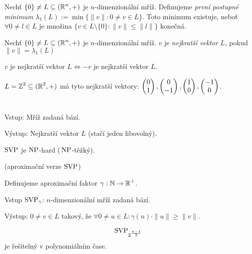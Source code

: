 \begin{definition}
Nechť $\{0\}\neq L\subseteq(\operatorname{\mathbb{R}}^n,+)$ je $n$-dimenzionální mříž. Definujeme \emph{první postupné minimum} 
$\lambda_1(L):=\min\{\|v\|:0\neq v\in L\}$. 
Toto minimum existuje, neboť $\forall 0 \neq l \in L$ je množina $\{v\in L\setminus\{0\}:\|v\|\leq\|l\|\}$ konečná.
\end{definition}

\begin{definition} 
Nechť $\{0\}\neq L\subseteq(\operatorname{\mathbb{R}}^n,+)$ je $n$-dimenzionální mříž. $v$ je \emph{nejkratší vektor} $L$, pokud $\|v\|=\lambda_1(L)$
\end{definition}

\begin{note}
$v$ je nejkratší vektor $L\iff -v$ je nejkratší vektor $L$.
\end{note}

\begin{note}
$L=\operatorname{\mathbb{Z}}^2\subseteq(\operatorname{\mathbb{R}}^2,+)$ má tyto nejkratší vektory: $\begin{pmatrix} 0 \\ 1 \end{pmatrix},\begin{pmatrix} 0 \\ -1 \end{pmatrix},\begin{pmatrix} 1 \\ 0 \end{pmatrix},\begin{pmatrix} -1 \\ 0 \end{pmatrix}$.
\end{note}

\begin{definition}\phantom{}\\
Vstup: Mříž zadaná bází.

Výstup: Nejkratší vektor $L$ (stačí jeden libovolný).
\end{definition}

\begin{theorem}[M. Ajtai, 1998]
$\operatorname{SVP}$ je $\operatorname{NP}$-hard ($\,\operatorname{NP}$-těžký).
\end{theorem}

\begin{definition}
(aproximační verze $\operatorname{SVP}$)

Definujeme aproximační faktor $\gamma:\operatorname{\mathbb{N}}\rightarrow\operatorname{\mathbb{R}}^+$.

Vstup $\operatorname{SVP}_\gamma$: $n$-dimenzionální mříž zadaná bází.

Výstup: $0\neq v\in L$ takový, že $\forall 0\neq u \in L: \gamma(n)\cdot\|u\|\geq\|v\|$.
\end{definition}

\begin{theorem}
$$\operatorname{SVP}_{2^\frac{n-1}{2}}$$ je řešitelný v polynomiálním čase.
\end{theorem}
